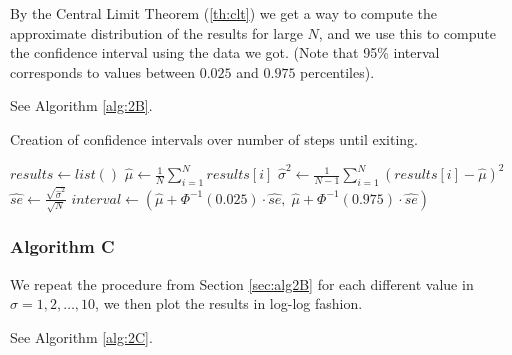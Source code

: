 By the Central Limit Theorem (\ref{th:clt}) we get a way to compute the approximate distribution of the results for large $N$, and we use this to compute the confidence interval using the data we got. (Note that 95\% interval corresponds to values between $0.025$ and $0.975$ percentiles).

See Algorithm \ref{alg:2B}.

\begin{algorithm}[H]
    \label{alg:2B}
    \caption{Creation of confidence intervals over number of steps until exiting.}
    $results \gets list()$ 
    $\hat{\mu} \gets \frac{1}{N}\sum^{N}_{i=1} results[i]$ \;
    $\hat{\sigma}^2 \gets \frac{1}{N-1}\sum^{N}_{i=1} (results[i] - \hat{\mu})^2$ \;
    $\hat{se} \gets \frac{\sqrt{\hat{\sigma}^2}}{\sqrt{N}}$ \;
    $interval \gets (\hat{\mu} + \Phi^{-1}(0.025) \cdot \hat{se}, \; \hat{\mu} + \Phi^{-1}(0.975)\cdot\hat{se})$
\end{algorithm}

\subsubsection{Algorithm C}
\label{sec:alg2C}



We repeat the procedure from Section \ref{sec:alg2B} for each different value in $\sigma = 1, 2, \dots, 10$, we then plot the results in log-log fashion.

See Algorithm \ref{alg:2C}.

